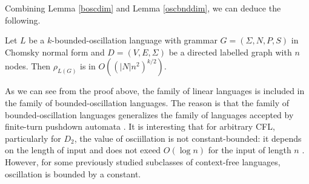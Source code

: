 Combining Lemma \ref{boscdim} and Lemma \ref{oscbnddim}, we can deduce the following.
\begin{theorem}
\label{oscbndosc}
Let $L$ be a $k$-bounded-oscillation language with grammar $G = (\Sigma, N, P, S)$ in Chomsky normal form and $D=(V, E, \Sigma)$ be a directed labelled graph with $n$ nodes. Then $\rho_{L(G)}$ is in $O((|N|n^2)^{k/2})$.
\end{theorem}

As we can see from the proof above, the family of linear languages is included in the family of bounded-oscillation languages. The reason is that the family of bounded-oscillation languages generalizes the family of languages accepted by finite-turn pushdown automata \cite{BoundOsc}. It is interesting that for arbitrary CFL, particularly for $D_2$, the value of osciillation is not constant-bounded: it depends on the length of input and does not exeed $O(\log n)$ for the input of length $n$ \cite*{Gundermann, Wechsung}. However, for some previously studied subclasses of context-free languages,  oscillation is bounded by a constant.


